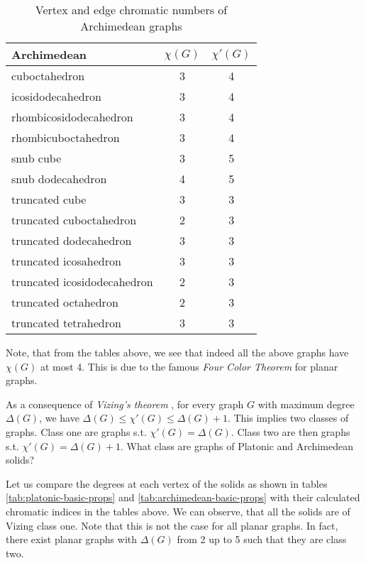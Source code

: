 \begin{table}[H]
    \centering
    \caption{Vertex and edge chromatic numbers of Archimedean graphs}
    \vspace{5pt}
    \label{tab:archimedean-chrom-nums}
    \begin{tabular}{|l|c|c|}
    \hline
    Archimedean & $\chi(G)$ & $\chi'(G)$ \\
    \hline\hline
    cuboctahedron & 3 & 4 \\
    \hline
    icosidodecahedron & 3 & 4 \\
    \hline
    rhombicosidodecahedron & 3 & 4 \\
    \hline
    rhombicuboctahedron & 3 & 4 \\
    \hline
    snub cube & 3 & 5 \\
    \hline
    snub dodecahedron & 4 & 5 \\
    \hline
    truncated cube & 3 & 3 \\
    \hline
    truncated cuboctahedron & 2 & 3 \\
    \hline
    truncated dodecahedron & 3 & 3 \\
    \hline
    truncated icosahedron & 3 & 3 \\
    \hline
    truncated icosidodecahedron & 2 & 3 \\
    \hline
    truncated octahedron & 2 & 3 \\
    \hline
    truncated tetrahedron & 3 & 3 \\
    \hline
    \end{tabular}
\end{table}

Note, that from the tables above, we see that indeed all the above graphs have $\chi(G)$ at most 4. This is due to the famous \textit{Four Color Theorem} \cite{appelhaken76} for planar graphs.

\begin{highlight}

As a consequence of \textit{Vizing's theorem} \cite{misra92}, for every graph $G$ with maximum degree $\Delta(G)$, we have $\Delta(G) \leq \chi'(G) \leq \Delta(G) + 1$. This implies two classes of graphs. Class one are graphs s.t. $\chi'(G) = \Delta(G)$. Class two are then graphs s.t. $\chi'(G) = \Delta(G) + 1$. What class are graphs of Platonic and Archimedean solids?

Let us compare the degrees at each vertex of the solids as shown in tables \ref{tab:platonic-basic-props} and \ref{tab:archimedean-basic-props} with their calculated chromatic indices in the tables above. We can observe, that all the solids are of Vizing class one. Note that this is not the case for all planar graphs. In fact, there exist planar graphs with $\Delta(G)$ from 2 up to 5 such that they are class two.

\end{highlight}


